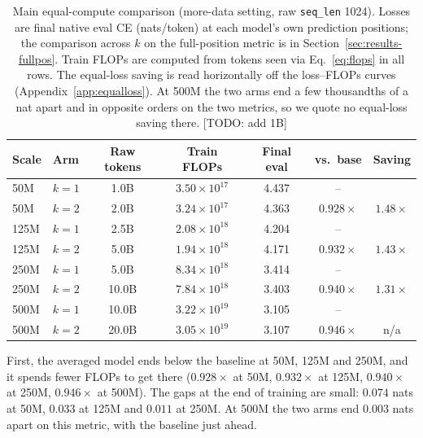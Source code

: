 \documentclass[11pt]{article}
\newcommand{\good}[1]{\textcolor{okgreen}{#1}}
\newcommand{\todo}[1]{\textcolor{warnred}{[TODO: #1]}}
\begin{document}
\begin{table}[h]
\centering
\caption{Main equal-compute comparison (more-data setting, raw
\texttt{seq\_len} 1024). Losses are final native eval CE (nats/token) at each
model's own prediction positions; the comparison across $k$ on the
full-position metric is in Section~\ref{sec:results-fullpos}. Train FLOPs are
computed from tokens seen via Eq.~\eqref{eq:flops} in all rows. The equal-loss
saving is read horizontally off the loss--FLOPs curves
(Appendix~\ref{app:equalloss}). At 500M the two arms end a few thousandths of
a nat apart and in opposite orders on the two metrics, so we quote no
equal-loss saving there.
\todo{add 1B}}
\label{tab:main}
\vspace{0.4em}
\small
\setlength{\tabcolsep}{4.5pt}
\begin{tabular}{llccccc}
\toprule
Scale & Arm & Raw tokens & Train FLOPs & Final eval & vs.\ base & Saving \\
\midrule
50M  & $k{=}1$ & 1.0B & $3.50\times10^{17}$ & 4.437 & -- & \\
50M  & $k{=}2$ & 2.0B & $3.24\times10^{17}$ & \good{4.363} & $0.928\times$ & \good{$1.48\times$} \\
\midrule
125M & $k{=}1$ & 2.5B & $2.08\times10^{18}$ & 4.204 & -- & \\
125M & $k{=}2$ & 5.0B & $1.94\times10^{18}$ & \good{4.171} & $0.932\times$ & \good{$1.43\times$} \\
\midrule
250M & $k{=}1$ & 5.0B & $8.34\times10^{18}$ & 3.414 & -- & \\
250M & $k{=}2$ & 10.0B & $7.84\times10^{18}$ & \good{3.403} & $0.940\times$ & \good{$1.31\times$} \\
\midrule
500M & $k{=}1$ & 10.0B & $3.22\times10^{19}$ & 3.105 & -- & \\
500M & $k{=}2$ & 20.0B & $3.05\times10^{19}$ & 3.107 & $0.946\times$ & n/a \\
\bottomrule
\end{tabular}
\end{table}

First, the averaged model ends below the baseline at 50M, 125M and 250M, and
it spends fewer FLOPs to get there ($0.928\times$ at 50M, $0.932\times$ at
125M, $0.940\times$ at 250M, $0.946\times$ at 500M). The gaps at the end of
training are small: $0.074$ nats at 50M, $0.033$ at 125M and $0.011$ at 250M.
At 500M the two arms end $0.003$ nats apart on this metric, with the baseline
just ahead.
\end{document}
